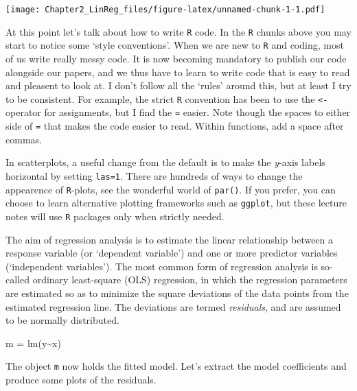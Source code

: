 \documentclass[
]{article}
\newenvironment{Shaded}{\begin{snugshade}}{\end{snugshade}}
\newcommand{\FunctionTok}[1]{\textcolor[rgb]{0.00,0.00,0.00}{#1}}
\newcommand{\NormalTok}[1]{#1}
\newcommand{\OtherTok}[1]{\textcolor[rgb]{0.56,0.35,0.01}{#1}}
\newcommand{\SpecialCharTok}[1]{\textcolor[rgb]{0.00,0.00,0.00}{#1}}
\begin{document}
\texttt{[image: Chapter2\_LinReg\_files/figure-latex/unnamed-chunk-1-1.pdf]}

At this point let's talk about how to write \texttt{R} code. In the
\texttt{R} chunks above you may start to notice some `style
conventions'. When we are new to \texttt{R} and coding, most of us write
really messy code. It is now becoming mandatory to publish our code
alongside our papers, and we thus have to learn to write code that is
easy to read and pleasent to look at. I don't follow all the `rules'
around this, but at least I try to be consistent. For example, the
strict \texttt{R} convention has been to use the \texttt{\textless{}-}
operator for assignments, but I find the \texttt{=} easier. Note though
the spaces to either side of \texttt{=} that makes the code easier to
read. Within functions, add a space after commas.

In scatterplots, a useful change from the default is to make the
\emph{y}-axis labels horizontal by setting \texttt{las=1}. There are
hundreds of ways to change the appearence of \texttt{R}-plots, see the
wonderful world of \texttt{par()}. If you prefer, you can choose to
learn alternative plotting frameworks such as \texttt{ggplot}, but these
lecture notes will use \texttt{R} packages only when strictly needed.

The aim of regression analysis is to estimate the linear relationship
between a response variable (or `dependent variable') and one or more
predictor variables (`independent variables'). The most common form of
regression analysis is so-called ordinary least-square (OLS) regression,
in which the regression parameters are estimated so as to minimize the
square deviations of the data points from the estimated regression line.
The deviations are termed \emph{residuals}, and are assumed to be
normally distributed.

\begin{Shaded}
\begin{Highlighting}[]
\NormalTok{m }\OtherTok{=} \FunctionTok{lm}\NormalTok{(y}\SpecialCharTok{\textasciitilde{}}\NormalTok{x)}
\end{Highlighting}
\end{Shaded}

The object \texttt{m} now holds the fitted model. Let's extract the
model coefficients and produce some plots of the residuals.
\end{document}
